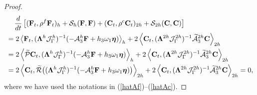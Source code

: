 \begin{proof}
\begin{align*}
&\hspace{0.4cm}\frac{d}{dt}\left[({\bf F}_t,\rho^f {\bf F}_t)_{h} + \mathcal{S}_{h}({\bf F},{\bf F}) + ({\bf C}_t,\rho^{c} {\bf C}_t)_{2h} + \mathcal{S}_{2h}({\bf C},{\bf C}) \right]   \nonumber\\
& = 2\left<{\bf F}_t,(\bm{\Lambda}^{h}\mathcal{J}^h_\Gamma)^{-1}(-\mathcal{A}_3^h{\bf F}+h_3\omega_1{\bm \eta})\right>_{h}+ 2\left<{\bf C}_t,(\bm{\Lambda}^{2h}\mathcal{J}^{2h}_\Gamma)^{-1}\widetilde{\mathcal{A}}_3^{2h}{\bf C}\right>_{2h} \nonumber\\
& = 2\left<\widetilde{\mathcal{P}}{\bf C}_t,(\bm{\Lambda}^{h}\mathcal{J}^h_\Gamma)^{-1}(-\mathcal{A}_3^h{\bf F}+h_3\omega_1{\bm \eta})\right>_{h}+ 2\left<{\bf C}_t, (\bm{\Lambda}^{2h}\mathcal{J}^{2h}_\Gamma)^{-1}\widetilde{\mathcal{A}}_3^{2h}{\bf C}\right>_{2h} \nonumber\\
& = 2\left<{\bf C}_t,\widetilde{\mathcal{R}}\big((\bm{\Lambda}^{h}\mathcal{J}^h_\Gamma)^{-1}(-\mathcal{A}_3^h{\bf F}+h_3\omega_1{\bm \eta})\big)\right>_{2h}+ 2\left<{\bf C}_t,(\bm{\Lambda}^{2h}\mathcal{J}^{2h}_\Gamma)^{-1}\widetilde{\mathcal{A}}_3^{2h}{\bf C}\right>_{2h} = 0,
\end{align*}
where we have used the notations in (\ref{hatAf})--(\ref{hatAc}).
\end{proof}